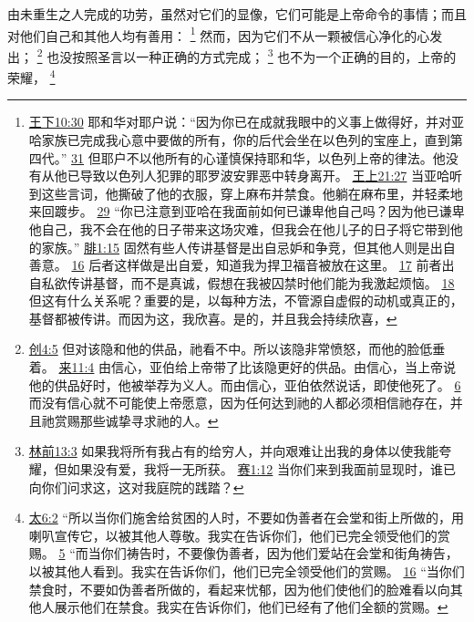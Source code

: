 \documentclass[12pt, a4paper, oneside]{ctexart}
\newcounter{parnum}[section]
\newcommand{\N}{%
   \noindent\refstepcounter{parnum}%
    \makebox[\parindent][l]{\textbf{\arabic{parnum}.}}}
\begin{document}
\N 由未重生之人完成的功劳，虽然对它们的显像，它们可能是上帝命令的事情；而且对他们自己和其他人均有善用：
	\footnote {
		\href{https://biblehub.com/2_kings/10-30.htm}{王下10:30} 耶和华对耶户说：“因为你已在成就我眼中的义事上做得好，并对亚哈家族已完成我心意中要做的所有，你的后代会坐在以色列的宝座上，直到第四代。”
		\href{https://biblehub.com/2_kings/10-31.htm}{31} 但耶户不以他所有的心谨慎保持耶和华，以色列上帝的律法。他没有从他已导致以色列人犯罪的耶罗波安罪恶中转身离开。
		\href{https://biblehub.com/1_kings/21-27.htm}{王上21:27} 当亚哈听到这些言词，他撕破了他的衣服，穿上麻布并禁食。他躺在麻布里，并轻柔地来回踱步。
		\href{https://biblehub.com/1_kings/21-29.htm}{29} “你已注意到亚哈在我面前如何已谦卑他自己吗？因为他已谦卑他自己，我不会在他的日子带来这场灾难，但我会在他儿子的日子将它带到他的家族。”
		\href{https://biblehub.com/philippians/1-15.htm}{腓1:15} 固然有些人传讲基督是出自忌妒和争竞，但其他人则是出自善意。
		\href{https://biblehub.com/philippians/1-16.htm}{16} 后者这样做是出自爱，知道我为捍卫福音被放在这里。
		\href{https://biblehub.com/philippians/1-17.htm}{17} 前者出自私欲传讲基督，而不是真诚，假想在我被囚禁时他们能为我激起烦恼。
		\href{https://biblehub.com/philippians/1-18.htm}{18} 但这有什么关系呢？重要的是，以每种方法，不管源自虚假的动机或真正的，基督都被传讲。而因为这，我欣喜。是的，并且我会持续欣喜，
	}
	然而，因为它们不从一颗被信心净化的心发出；
	\footnote {
		\href{https://biblehub.com/genesis/4-5.htm}{创4:5} 但对该隐和他的供品，祂看不中。所以该隐非常愤怒，而他的脸低垂着。
		\href{https://biblehub.com/hebrews/11-4.htm}{来11:4} 由信心，亚伯给上帝带了比该隐更好的供品。由信心，当上帝说他的供品好时，他被举荐为义人。而由信心，亚伯依然说话，即使他死了。
		\href{https://biblehub.com/hebrews/11-6.htm}{6} 而没有信心就不可能使上帝愿意，因为任何达到祂的人都必须相信祂存在，并且祂赏赐那些诚挚寻求祂的人。
	}
	也没按照圣言以一种正确的方式完成；
	\footnote {
		\href{https://biblehub.com/1_corinthians/13-3.htm}{林前13:3} 如果我将所有我占有的给穷人，并向艰难让出我的身体以使我能夸耀，但如果没有爱，我将一无所获。
		\href{https://biblehub.com/isaiah/1-12.htm}{赛1:12} 当你们来到我面前显现时，谁已向你们问求这，这对我庭院的践踏？
	}
	也不为一个正确的目的，上帝的荣耀，
	\footnote {
		\href{https://biblehub.com/matthew/6-2.htm}{太6:2} “所以当你们施舍给贫困的人时，不要如伪善者在会堂和街上所做的，用喇叭宣传它，以被其他人尊敬。我实在告诉你们，他们已完全领受他们的赏赐。
		\href{https://biblehub.com/matthew/6-5.htm}{5} “而当你们祷告时，不要像伪善者，因为他们爱站在会堂和街角祷告，以被其他人看到。我实在告诉你们，他们已完全领受他们的赏赐。
		\href{https://biblehub.com/matthew/6-16.htm}{16} “当你们禁食时，不要如伪善者所做的，看起来忧郁，因为他们使他们的脸难看以向其他人展示他们在禁食。我实在告诉你们，他们已经有了他们全额的赏赐。
	}
\end{document}
